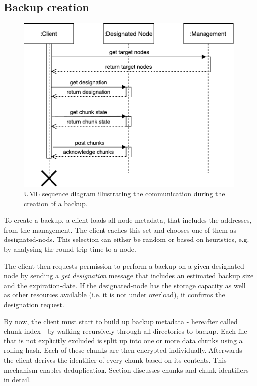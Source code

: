 \subsection{Backup creation}
\begin{figure}[h]
    \centering
    \includegraphics[width=\linewidth]{resources/create_backup_designated}
    \caption[Create Backup UML Sequence Diagram]{UML sequence diagram illustrating the communication during the creation of a backup.}
\end{figure}

To create a backup, a \gls{client} loads all \gls{node}-metadata, that includes the addresses, from the \gls{management}. The \gls{client} caches this set and chooses one of them as \gls{designated-node}. This selection can either be random or based on heuristics, e.g. by analysing the round trip time to a \gls{node}.

The \gls{client} then requests permission to perform a backup on a given \gls{designated-node} by sending a \emph{get designation} message that includes an estimated backup size and the \gls{expiration-date}. If the \gls{designated-node} has the storage capacity as well as other resources available (i.e. it is not under overload), it confirms the designation request.

By now, the \gls{client} must start to build up backup metadata - hereafter called \gls{chunk-index} - by walking recursively through all directories to backup. Each file that is not explicitly excluded is split up into one or more data \glspl{chunk} using a rolling hash\cite{borg-data-structures}. Each of these \glspl{chunk} are then encrypted individually. Afterwards the \gls{client} derives the identifier of every \gls{chunk} based on its contents. This mechanism enables deduplication. Section  discusses \glspl{chunk} and \glspl{chunk-identifier} in detail.

